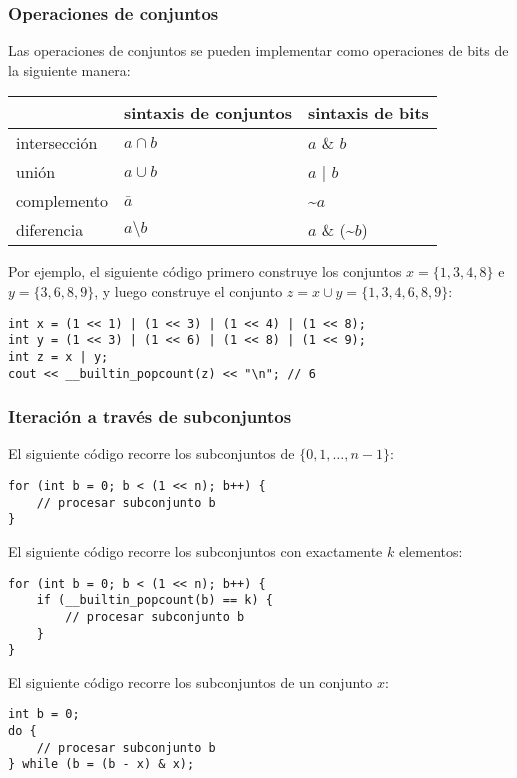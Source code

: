 \subsubsection{Operaciones de conjuntos}

Las operaciones de conjuntos se pueden implementar como operaciones de bits de la siguiente manera:

\begin{center}
    \begin{tabular}{lll}
                     & sintaxis de conjuntos & sintaxis de bits            \\
        \hline
        intersección & $a \cap b$            & $a$ \& $b$                  \\
        unión        & $a \cup b$            & $a$ | $b$                   \\
        complemento  & $\bar a$              & \textasciitilde$a$          \\
        diferencia   & $a \setminus b$       & $a$ \& (\textasciitilde$b$) \\
    \end{tabular}
\end{center}

Por ejemplo, el siguiente código primero construye
los conjuntos $x=\{1,3,4,8\}$ e $y=\{3,6,8,9\}$,
y luego construye el conjunto $z = x \cup y = \{1,3,4,6,8,9\}$:

\begin{lstlisting}
int x = (1 << 1) | (1 << 3) | (1 << 4) | (1 << 8);
int y = (1 << 3) | (1 << 6) | (1 << 8) | (1 << 9);
int z = x | y;
cout << __builtin_popcount(z) << "\n"; // 6
\end{lstlisting}

\subsubsection{Iteración a través de subconjuntos}

El siguiente código recorre
los subconjuntos de $\{0,1,\ldots,n-1\}$:

\begin{lstlisting}
for (int b = 0; b < (1 << n); b++) {
    // procesar subconjunto b
}
\end{lstlisting}
El siguiente código recorre
los subconjuntos con exactamente $k$ elementos:
\begin{lstlisting}
for (int b = 0; b < (1 << n); b++) {
    if (__builtin_popcount(b) == k) {
        // procesar subconjunto b
    }
}
\end{lstlisting}
El siguiente código recorre los subconjuntos
de un conjunto $x$:
\begin{lstlisting}
int b = 0;
do {
    // procesar subconjunto b
} while (b = (b - x) & x);
\end{lstlisting}

